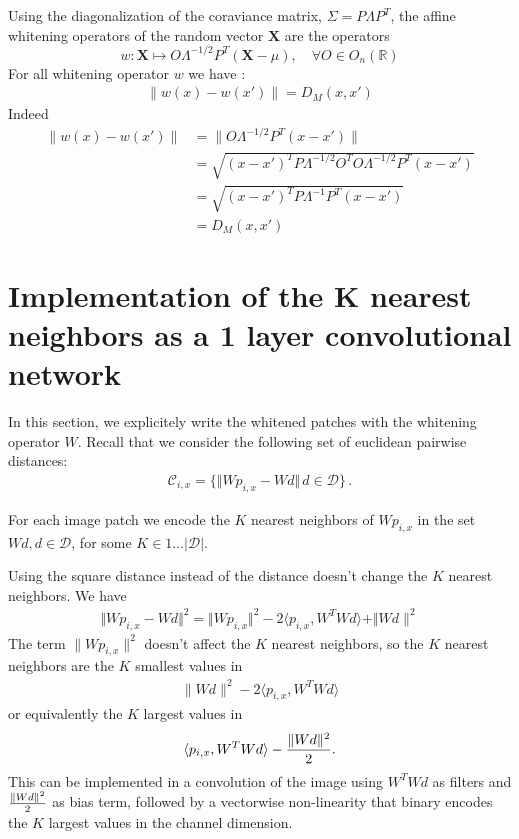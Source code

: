 \documentclass{article}
\begin{document}
Using the diagonalization of the coraviance matrix,  $\Sigma = P\Lambda P^T$, the affine whitening operators of the random vector $\mathbf{X}$ are the operators 
\begin{equation}
\label{whitening}
     w : \mathbf{X} \mapsto O \Lambda^{-1/2} P^T (\mathbf{X} - \mu), \quad \forall O \in  O_n (\mathbb{R})
\end{equation}
For all whitening operator $w$ we have :
\begin{align*}
\|w(x) - w(x')\| = D_M(x, x')
\end{align*}
Indeed 
\begin{align*}
  \|w(x) - w(x')\|
    &= \| O \Lambda^{-1/2} P^T ( x - x') \|\\
    &= \sqrt{(x - x')^T P \Lambda^{-1/2} O^T O \Lambda^{-1/2} P^T (x - x') }\\
    &=  \sqrt{ (x - x')^T P \Lambda^{-1} P^T (x - x')} \\
    &= D_M(x, x') 
\end{align*}

\section{Implementation of the K nearest neighbors as a 1 layer convolutional network}

In this section, we explicitely write the whitened patches with the whitening operator $W$.
Recall that  we consider the following set of euclidean pairwise distances:
\begin{align*}\mathcal{C}_{i, x} =\{\Vert W p_{i, x} - W d \Vert\, d\in\mathcal{D} \}\,.\end{align*}

For each image patch we encode the $K$ nearest neighbors of $W p_{i,x}$ in the set $Wd, d \in \mathcal{D}$, for some $ K \in 1 \ldots|\mathcal{D}| $.

Using the square distance instead of the distance doesn't change the $K$ nearest neighbors.
We have 
\begin{align*} \Vert Wp_{i,x} - Wd \Vert^2 = \Vert Wp_{i,x} \Vert^2 - 2 \langle p_{i,x}, W^T W d \rangle + \Vert Wd\|^2 \end{align*}
The term $\|Wp_{i,x}\|^2$ doesn't affect the $K$ nearest neighbors, so the $K$ nearest neighbors are the $K$ smallest values in
\begin{align*}
        \|Wd \|^2 - 2\langle p_{i,x}, W^T W d \rangle
\end{align*}
or equivalently the  $K$ largest values in
\begin{align*}
        \langle p_{i,x}, W^T W d \rangle - {\|Wd \|^2 \over 2} .
\end{align*}
This can be implemented in a convolution of the image using $W^T W d$ as filters and ${\|Wd \|^2 \over 2}$ as bias term, followed by a vectorwise non-linearity that binary encodes the $K$ largest values in the channel dimension.
\end{document}
